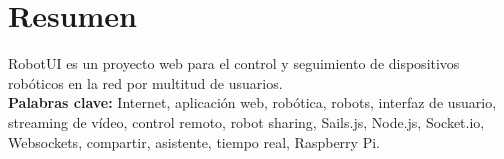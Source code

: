 

\section*{Resumen}
\label{resumen}

RobotUI es un proyecto web para el control y seguimiento de dispositivos robóticos en la red por multitud de usuarios.\\


\textbf{Palabras clave:} Internet, aplicación web, robótica, robots, interfaz de usuario, streaming de vídeo, control remoto, robot sharing, Sails.js, Node.js, Socket.io, Websockets, compartir, 
asistente, tiempo real, Raspberry Pi.
